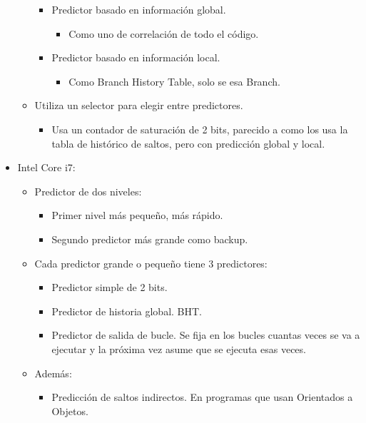 \documentclass[12pt, twoside, openright]{report} %
\begin{document}
\begin{itemize}
\begin{itemize}
      \begin{itemize}
      
      \item
        Predictor basado en información global.

        \begin{itemize}
        
        \item
          Como uno de correlación de todo el código.
        \end{itemize}
      \item
        Predictor basado en información local.

        \begin{itemize}
        
        \item
          Como Branch History Table, solo se esa Branch.
        \end{itemize}
      \end{itemize}
    \item
      Utiliza un selector para elegir entre predictores.

      \begin{itemize}
      
      \item
        Usa un contador de saturación de 2 bits, parecido a como los usa
        la tabla de histórico de saltos, pero con predicción global y
        local.
      \end{itemize}
    \end{itemize}
  \item Intel Core i7:

    \begin{itemize}
    
    \item
      Predictor de dos niveles:

      \begin{itemize}
      
      \item
        Primer nivel más pequeño, más rápido.
      \item
        Segundo predictor más grande como backup.
      \end{itemize}
    \item
      Cada predictor grande o pequeño tiene 3 predictores:

      \begin{itemize}
      
      \item
        Predictor simple de 2 bits.
      \item
        Predictor de historia global. BHT.
      \item
        Predictor de salida de bucle. Se fija en los bucles cuantas
        veces se va a ejecutar y la próxima vez asume que se ejecuta
        esas veces.
      \end{itemize}
    \item
      Además:
      \begin{itemize}
        \item Predicción de saltos indirectos. En programas que usan Orientados a
          Objetos.
  

\end{itemize}
\end{itemize}
\end{itemize}
\end{document}
